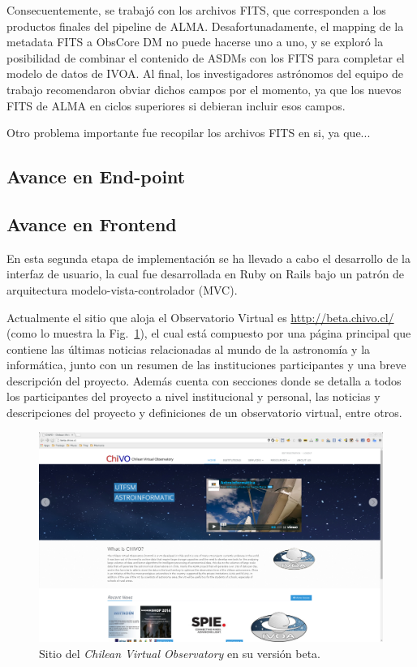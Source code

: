 Consecuentemente, se trabajó con los archivos FITS, que corresponden
a los productos finales del pipeline de ALMA. 
Desafortunadamente, el mapping de la metadata FITS a ObsCore DM no
puede hacerse uno a uno, y se exploró la posibilidad de combinar
el contenido de ASDMs con los FITS para completar el modelo
de datos de IVOA. Al final, los investigadores astrónomos del equipo
de trabajo recomendaron obviar dichos campos por el momento, ya que
los nuevos FITS de ALMA en ciclos superiores si debieran incluir esos campos.

Otro problema importante fue recopilar los archivos FITS en si, 
ya que...

\subsection{Avance en End-point}

\subsection{Avance en Frontend}

En esta segunda etapa de implementación se ha llevado a cabo el
desarrollo de la interfaz de usuario, la cual fue desarrollada en
Ruby on Rails bajo un patrón de arquitectura modelo-vista-controlador
(MVC).

Actualmente el sitio que aloja el Observatorio Virtual es
\url{http://beta.chivo.cl/} (como lo muestra la Fig.~\ref{img:chivo}),
el cual está compuesto por una página principal que contiene las
últimas noticias relacionadas al mundo de la astronomía y la
informática, junto con un resumen de las instituciones participantes y
una breve descripción del proyecto. Además cuenta con secciones donde
se detalla a todos los participantes del proyecto a nivel
institucional y personal, las noticias y descripciones del proyecto y
definiciones de un observatorio virtual, entre otros.

\begin{figure}[ht!]
    \begin{center}
	\includegraphics[scale=.2]{img/chivo}
    \end{center}
    \caption{Sitio del \emph{Chilean Virtual Observatory} en su
      versión beta.}\label{img:chivo}
\end{figure}

